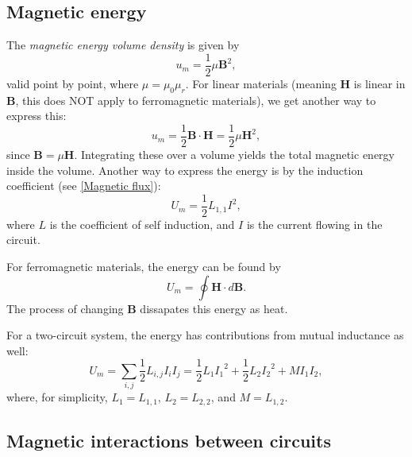 \documentclass[a4paper, 12pt]{article}
\renewcommand{\vec}[1]{\bm{#1}}
\newcommand{\B}{\ensuremath{\vec{B}}}
\renewcommand{\H}{\ensuremath{\vec{H}}}
\begin{document}
    \subsection{Magnetic energy}
        The \textit{magnetic energy volume density} is given by
        \begin{equation}
            u_m = \frac{1}{2}\mu\B^2,
        \end{equation}
        valid point by point, where $\mu = \mu_0 \mu_r $. 
        For linear materials (meaning \H{} is linear in \B, this does NOT apply to ferromagnetic materials), we get another way to express this: 
        \begin{equation}
            u_m = \frac{1}{2}\B\cdot\H = \frac{1}{2}\mu\H^2,
        \end{equation}
        since $\B = \mu\H{}$. Integrating these over a volume yields the total magnetic energy inside the volume.
        Another way to express the energy is by the induction coefficient (see \ref{Magnetic flux}):
        \begin{equation}
            U_m = \frac{1}{2}L_{1,1}I^2,
        \end{equation}
        where $L$ is the coefficient of self induction, and $I$ is the current flowing in the circuit.

        For ferromagnetic materials, the energy can be found by
        \begin{equation}
            U_m = \oint \H \cdot d\B.
        \end{equation}
        The process of changing \B{} dissapates this energy as heat.

        For a two-circuit system, the energy has contributions from mutual inductance as well: 
        \begin{equation}
            U_m = \sum_{i,j}\frac{1}{2}L_{i,j}I_iI_j = \frac{1}{2}L_1{I_1}^2 + \frac{1}{2}L_2{I_2}^2 + MI_1I_2,
        \end{equation}
        where, for simplicity, $L_1 = L_{1,1},\, L_2 = L_{2,2}$, and $M = L_{1,2}$.
    
    \subsection{Magnetic interactions between circuits}
\end{document}
